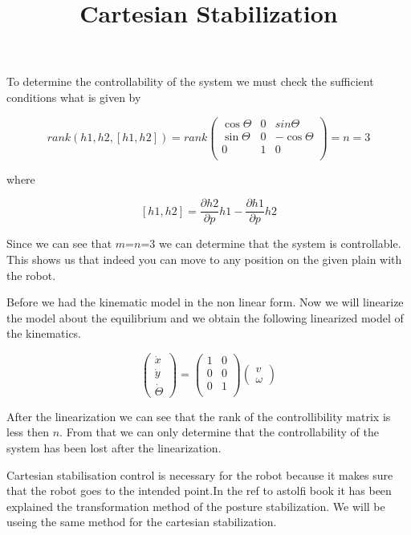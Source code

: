 To determine the controllability of the system we must check the sufficient conditions what is given by

\begin{equation} \label{eq75}
rank(h1,h2,[h1,h2])
=
rank
\begin{pmatrix} 
 \cos\Theta & 0 & sin\Theta\\ 
 \sin\Theta & 0 & -\cos\Theta\\
 0 & 1 & 0\\
 \end{pmatrix} 
=
n
=
3
\end{equation}

where

\begin{equation} \label{eq76}
[h1,h2]
=
\frac{\partial h2}{\partial p}h1
-
\frac{\partial h1}{\partial p}h2
\end{equation}

Since we can see that $m$=$n$=3 we can determine that the system is controllable.  This shows us that indeed you can move to any position on the given plain with the robot.

Before we had the kinematic model in the non linear form. Now we will linearize the model about the equilibrium and we obtain the following linearized model of the kinematics.

\begin{equation}
\begin{pmatrix}
\dot{x} \\
\dot{y} \\
\dot{\Theta}
\end{pmatrix}
=
\begin{pmatrix}
1 & 0 \\
0 & 0 \\
0 & 1 \\
\end{pmatrix}
\begin{pmatrix}
v \\
\omega
\end{pmatrix}
\end{equation}

After the linearization we can see that the rank of the controllibility matrix is less then $n$. From that we can only determine that the controllability of the system has been lost after the linearization.

\title{Cartesian Stabilization}

Cartesian stabilisation control is necessary for the robot because it makes sure that the robot goes to the intended point.In the {\color{red}ref to astolfi book} it has been explained the transformation method of the posture stabilization. We will be useing the same method for the cartesian stabilization. 


